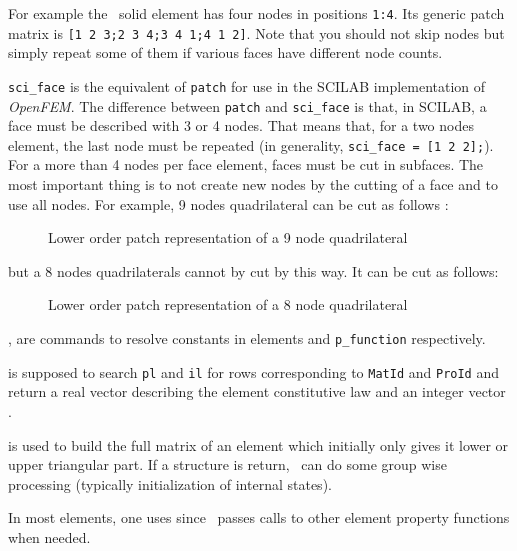 \noindent For example the \tetra\ solid element has four nodes in positions {\tt 1:4}. Its generic patch matrix is {\tt [1 2 3;2 3 4;3 4 1;4 1 2]}. Note that you should not skip nodes but simply repeat some of them if various faces have different node counts. 

{\tt sci\_face} is the equivalent of {\tt patch} for use in the SCILAB implementation of {\sl OpenFEM}. The difference between {\tt patch} and {\tt sci\_face} is that, in SCILAB, a face must be described with 3 or 4 nodes. That means that, for a two nodes element, the last node must be repeated (in generality, \verb+sci_face = [1 2 2];+). For a more than 4 nodes per face element, faces must be cut in subfaces. The most important thing is to not create new nodes by the cutting of a face and to use all nodes. For example, 9 nodes quadrilateral can be cut as follows : 
\begin{figure}[H]
\centering
{} %
 \caption{Lower order patch representation of a 9 node quadrilateral}
\end{figure}
but a 8 nodes quadrilaterals cannot by cut by this way. It can be cut as follows:
\begin{figure}[H]
\centering
{} %
 \caption{Lower order patch representation of a 8 node quadrilateral}
\end{figure}



,  are commands to resolve constants in elements and {\tt p\_function} respectively.

 is supposed to search {\tt pl} and {\tt il} for rows corresponding to {\tt MatId} and {\tt ProId} and return a real vector  describing the element constitutive law and an integer vector . 

 is used to build the full matrix of an element which initially only gives it lower or upper triangular part. If a structure is return, \femknl\ can do some group wise processing (typically initialization of internal states).

In most elements, one uses  since \psolid\ passes calls to other element property functions when needed.

